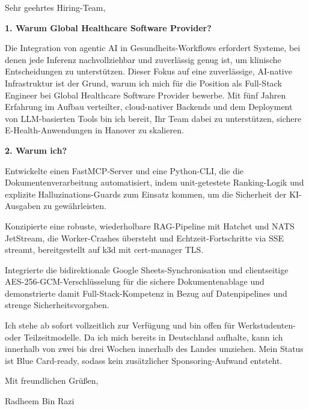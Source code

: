 \documentclass[11pt,a4paper]{coverletter}
\begin{document}
\opening{Sehr geehrtes Hiring-Team,}

\vspace{8pt}\noindent\textbf{1. Warum Global Healthcare Software Provider?}\par\vspace{3pt}

Die Integration von agentic AI in Gesundheits-Workflows erfordert Systeme, bei denen jede Inferenz nachvollziehbar und zuverlässig genug ist, um klinische Entscheidungen zu unterstützen. Dieser Fokus auf eine zuverlässige, AI-native Infrastruktur ist der Grund, warum ich mich für die Position als Full-Stack Engineer bei Global Healthcare Software Provider bewerbe. Mit fünf Jahren Erfahrung im Aufbau verteilter, cloud-nativer Backends und dem Deployment von LLM-basierten Tools bin ich bereit, Ihr Team dabei zu unterstützen, sichere E-Health-Anwendungen in Hanover zu skalieren.

\vspace{8pt}\noindent\textbf{2. Warum ich?}\par\vspace{3pt}

\bullets

  \item Entwickelte einen FastMCP-Server und eine Python-CLI, die die Dokumentenverarbeitung automatisiert, indem unit-getestete Ranking-Logik und explizite Halluzinations-Guards zum Einsatz kommen, um die Sicherheit der KI-Ausgaben zu gewährleisten.

  \item Konzipierte eine robuste, wiederholbare RAG-Pipeline mit Hatchet und NATS JetStream, die Worker-Crashes übersteht und Echtzeit-Fortschritte via SSE streamt, bereitgestellt auf k3d mit cert-manager TLS.

  \item Integrierte die bidirektionale Google Sheets-Synchronisation und clientseitige AES-256-GCM-Verschlüsselung für die sichere Dokumentenablage und demonstrierte damit Full-Stack-Kompetenz in Bezug auf Datenpipelines und strenge Sicherheitsvorgaben.

\bulletsend

Ich stehe ab sofort vollzeitlich zur Verfügung und bin offen für Werkstudenten- oder Teilzeitmodelle. Da ich mich bereits in Deutschland aufhalte, kann ich innerhalb von zwei bis drei Wochen innerhalb des Landes umziehen. Mein Status ist Blue Card-ready, sodass kein zusätzlicher Sponsoring-Aufwand entsteht.

\closing{Mit freundlichen Grüßen,}{Radheem Bin Razi}
\end{document}
